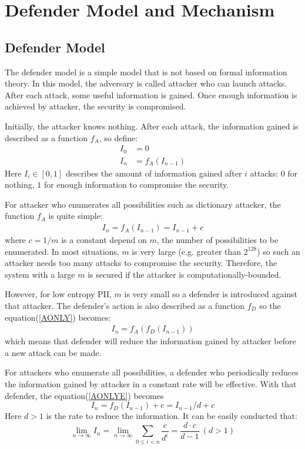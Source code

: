 \documentclass[10pt, conference, compsocconf]{IEEEtran}
\begin{document}
\section{Defender Model and Mechanism}\label{sec_def}
	\subsection{Defender Model}
		The defender model is a simple model that
		is not based on formal information theory.
		In this model, the adversary is called attacker 
		who can launch attacks. After
		each attack, some useful information is gained.
		Once enough information is achieved by attacker, 
		the security is compromised.
		
		Initially, the attacker knows nothing. After
		each attack, the information gained
		is described as a function $f_A$, so define:
		\begin{align}
			I_0 &= 0\\
			I_n &= f_A(I_{n-1})\label{AONLY}
		\end{align}
		Here $I_i \in [0, 1]$ describes the amount of information
		gained after $i$ attacks: $0$ for nothing, $1$ for enough
		information to compromise the security.
		
		For attacker who enumerates all possibilities such
		as dictionary attacker, the
		function $f_A$ is quite simple:
		\begin{align}
			I_n = f_A(I_{n-1}) = I_{n-1}+c\label{AONLYE}
		\end{align}
		where $c = 1/m$ is a constant depend on $m$,
		the number of possibilities to be enumerated. 
		In most situations, $m$ is very large (e.g. greater than $2^{128}$)
		 so such an attacker needs too many 
		attacks to compromise the security. Therefore, the system with
		a large $m$ is secured if the attacker is computationally-bounded.
		
		However, for low entropy PII, $m$ is very small so
		a defender is introduced against that attacker. 
		The defender's action is also described as a function $f_D$
		so the equation(\ref{AONLY}) becomes:
		\begin{align}
			I_n = f_A(f_D(I_{n-1}))
		\end{align}
		which means that defender will reduce the information
		gained by attacker before a new attack can be made.
		
		For attackers who enumerate all possibilities,
		a defender 
		who periodically reduces the information gained by
		attacker in a constant rate will be effective. With
		that defender,
		the equation(\ref{AONLYE}) becomes
		\begin{equation}
			I_n = f_D(I_{n-1})+c = I_{n-1}/d+c
		\end{equation}
		Here $d > 1$ is the rate to reduce the information.
		It can be easily conducted that:
		\begin{equation*}
			\lim_{n \rightarrow \infty} I_n = \lim_{n \rightarrow \infty} \sum_{0 \leq i < n} \frac{c}{d^i}
				= \frac{d \cdot c}{d-1} ~(d > 1)
		\end{equation*}
		
\end{document}
